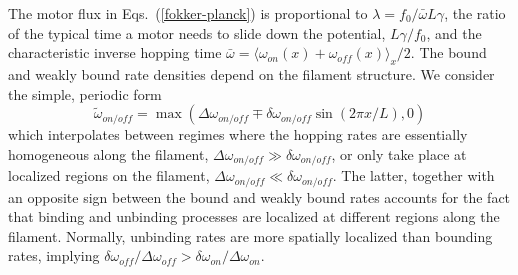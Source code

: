 \documentclass[prl,aps,twocolumn, floatfix, superscriptaddress,showpacs]{revtex4}
\begin{document}
The motor flux in Eqs.~(\ref{fokker-planck}) is proportional to $\lambda=f_0/\bar{\omega} L \gamma$, the ratio of the typical time a motor needs to slide down the potential, $L \gamma/f_0$, and the characteristic inverse hopping time $\bar{\omega}=\langle \omega_{on}(x)+\omega_{off}(x)\rangle_x/2$.
The bound and weakly bound rate densities depend on the filament structure. We consider the simple, periodic form
\begin{equation}
 \tilde{\omega}_{on/off}=\max(\Delta \omega_{on/off}\mp\delta \omega_{on/off}\sin(2\pi x/L),0)
 \label{rates}
\end{equation}
which interpolates between  regimes where the hopping rates are essentially homogeneous along the filament, $\Delta \omega_{on/off}\gg\delta \omega_{on/off}$,  or only take place at  localized regions  on the filament, $\Delta \omega_{on/off}\ll\delta \omega_{on/off}$. The latter, together with an opposite sign between the bound and weakly bound rates accounts for the fact that binding and unbinding processes are  localized at different  regions along the filament. Normally,  unbinding rates are  more spatially localized than bounding rates, implying $\delta \omega_{off}/\Delta \omega_{off} > \delta \omega_{on}/\Delta \omega_{on}$.
\end{document}
